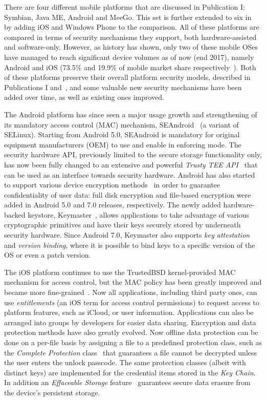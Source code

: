 There are four different mobile platforms that are discussed in Publication I: Symbian, Java ME, Android and MeeGo. This set is further extended to six in~\cite{2013Asokan} by adding iOS and Windows Phone to the comparison. All of these platforms are compared in terms of security mechanisms they support, both hardware-assisted and software-only. However, as history has shown, only two of these mobile OSes have managed to reach significant device volumes as of now (end 2017), namely Android and iOS (73.5\% and 19.9\% of mobile market share respectively~\cite{osshare}). Both of these platforms preserve their overall platform security models, described in Publications I and~\cite{2013Asokan}, and some valuable new security mechanisms have been added over time, as well as existing ones improved. 

The Android platform has since seen a major usage growth and strengthening of its mandatory access control (MAC) mechanism, SEAndroid~\cite{smalley12} (a variant of SELinux). Starting from Android 5.0, SEAndroid is mandatory for original equipment manufacturers (OEM) to use and enable in enforcing mode. The security hardware API, previously limited to the secure storage functionality only, has now been fully changed to an extensive and powerful \textit{Trusty TEE API}~\cite{trusty} that can be used as an interface towards security hardware. Android has also started to support various device encryption methods~\cite{androidencr} in order to guarantee confidentiality of user data: full disk encryption and file-based encryption were added in Android 5.0 and 7.0 releases, respectively. The newly added hardware-backed keystore, Keymaster~\cite{androidkeymaster}, allows applications to take advantage of various cryptographic primitives and have their keys securely stored by underneath security hardware. Since Android 7.0, Keymaster also supports \textit{key attestation} and \textit{version binding}, where it is possible to bind keys to a specific version of the OS or even a patch version. 

The iOS platform continues to use the TrustedBSD kernel-provided MAC mechanism for access control, but the MAC policy has been greatly improved and became more fine-grained~\cite{iOS11}.  Now all applications, including third party ones, can use \textit{entitlements} (an iOS term for access control permissions) to request access to platform features, such as iCloud, or user information. Applications can also be arranged into groups by developers for easier data sharing. Encryption and data protection methods have also greatly evolved. Now offline data protection can be done on a per-file basis by assigning a file to a predefined protection class, such as the \textit{Complete Protection} class~\cite{iOS11} that guarantees a file cannot be decrypted unless the user enters the unlock passcode. The same protection classes (albeit with distinct keys) are implemented for the credential items stored in the \textit{Key Chain}. In addition an \textit{Effaceable Storage} feature~\cite{iOS11} guarantees secure data erasure from the device's persistent storage. 

